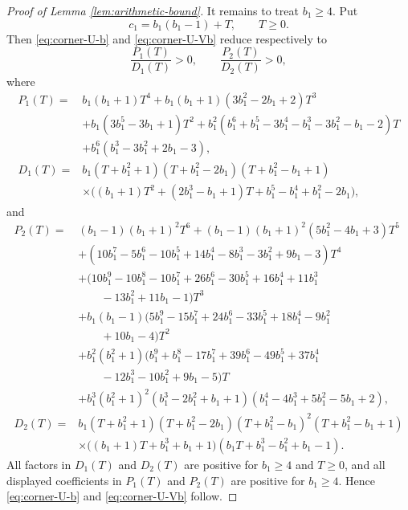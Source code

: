 \documentclass[10pt,a4paper]{amsart}
\begin{document}
\begin{proof}[Proof of Lemma \ref{lem:arithmetic-bound}]
It remains to treat $b_1\ge4$.  Put
$$
        c_1=b_1(b_1-1)+T,
        \qquad T\ge0.
$$
Then \eqref{eq:corner-U-b} and \eqref{eq:corner-U-Vb} reduce respectively to
$$
        \frac{P_1(T)}{D_1(T)}>0,
        \qquad
        \frac{P_2(T)}{D_2(T)}>0,
$$
where
\begin{align*}
P_1(T)={}&b_1(b_1+1)T^4
        +b_1(b_1+1)(3b_1^2-2b_1+2)T^3\\
        &+b_1(3b_1^5-3b_1+1)T^2
        +b_1^2(b_1^6+b_1^5-3b_1^4-b_1^3-3b_1^2-b_1-2)T\\
        &+b_1^6(b_1^3-3b_1^2+2b_1-3),\\[3pt]
D_1(T)={}&b_1(T+b_1^2+1)(T+b_1^2-2b_1)(T+b_1^2-b_1+1)\\
        &\times\bigl((b_1+1)T^2+(2b_1^3-b_1+1)T+b_1^5-b_1^4+b_1^2-2b_1\bigr),
\end{align*}
and
\begin{align*}
P_2(T)={}&(b_1-1)(b_1+1)^2T^6
        +(b_1-1)(b_1+1)^2(5b_1^2-4b_1+3)T^5\\
        &+(10b_1^7-5b_1^6-10b_1^5+14b_1^4-8b_1^3-3b_1^2+9b_1-3)T^4\\
        &+(10b_1^9-10b_1^8-10b_1^7+26b_1^6-30b_1^5+16b_1^4+11b_1^3\\
        &\qquad -13b_1^2+11b_1-1)T^3\\
        &+b_1(b_1-1)(5b_1^9-15b_1^7+24b_1^6-33b_1^5+18b_1^4-9b_1^2\\
        &\qquad +10b_1-4)T^2\\
        &+b_1^2(b_1^2+1)(b_1^9+b_1^8-17b_1^7+39b_1^6-49b_1^5+37b_1^4\\
        &\qquad -12b_1^3-10b_1^2+9b_1-5)T\\
        &+b_1^3(b_1^2+1)^2(b_1^3-2b_1^2+b_1+1)(b_1^4-4b_1^3+5b_1^2-5b_1+2),\\[3pt]
D_2(T)={}&b_1(T+b_1^2+1)(T+b_1^2-2b_1)(T+b_1^2-b_1)^2(T+b_1^2-b_1+1)\\
        &\times\bigl((b_1+1)T+b_1^3+b_1+1\bigr)(b_1T+b_1^3-b_1^2+b_1-1).
\end{align*}
All factors in $D_1(T)$ and $D_2(T)$ are positive for $b_1\ge4$ and $T\ge0$, and all displayed coefficients in $P_1(T)$ and $P_2(T)$ are positive for $b_1\ge4$.  Hence \eqref{eq:corner-U-b} and \eqref{eq:corner-U-Vb} follow.


\end{proof}
\end{document}
